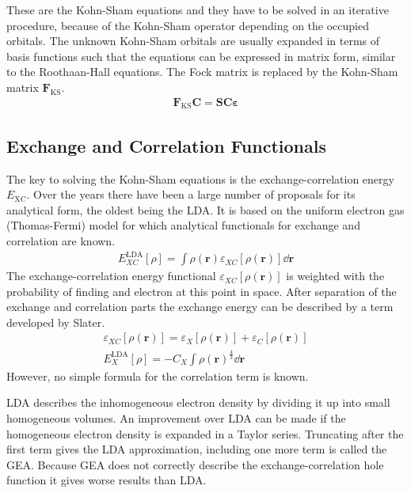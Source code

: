 %
These are the Kohn-Sham equations and they have to be solved in an iterative
procedure, because of the Kohn-Sham operator depending on the occupied
orbitals.  The unknown Kohn-Sham orbitals are usually expanded in terms of
basis functions such that the equations can be expressed in matrix form,
similar to the Roothaan-Hall equations. The Fock matrix is replaced by the
Kohn-Sham matrix $\mathbf{F}_\text{KS}$.
%
\begin{align}
    \mathbf{F}_\text{KS}\mathbf{C} = \mathbf{SC\varepsilon}
\end{align}
%
\subsection{Exchange and Correlation Functionals}
\label{sec:exchangecorrelationfunctionals}

The key to solving the Kohn-Sham equations is the exchange-correlation energy
$E_\text{XC}$. Over the years there have been a large number of proposals for its analytical form,
the oldest being the \ac{LDA}. It is based on the uniform electron gas (Thomas-Fermi) model for
which analytical functionals for exchange and correlation are known.
%
\begin{align}
    E_{XC}^\text{LDA}\left[\rho\right]=\int\rho(\mathbf{r})\varepsilon_{XC}\left[\rho(\mathbf{r})\right]\dd\mathbf{r}
\end{align}
%
The exchange-correlation energy functional $\varepsilon_{XC}\left[\rho(\mathbf{r})\right]$
is weighted with the probability of finding and electron at this point in
space. After separation of the exchange and correlation parts the exchange
energy can be described by a term developed by Slater.
%
\begin{align}
	\varepsilon_{XC}\left[\rho(\mathbf{r})\right] = \varepsilon_{X}\left[\rho(\mathbf{r})\right] + \varepsilon_{C}\left[\rho(\mathbf{r})\right]\\
	E_{X}^\text{LDA}\left[\rho\right] = -C_X\int\rho(\mathbf{r})^{\frac{4}{3}}\dd\mathbf{r}
\end{align}
%
However, no simple formula for the correlation term is known.

\ac{LDA} describes the inhomogeneous electron density by dividing it up into
small homogeneous volumes. An improvement over \ac{LDA} can be made if the
homogeneous electron density is expanded in a Taylor series. Truncating after the
first term gives the \ac{LDA} approximation, including one more term is called
the \ac{GEA}. Because \ac{GEA} does not correctly describe the
exchange-correlation hole function it gives worse results than \ac{LDA}.

